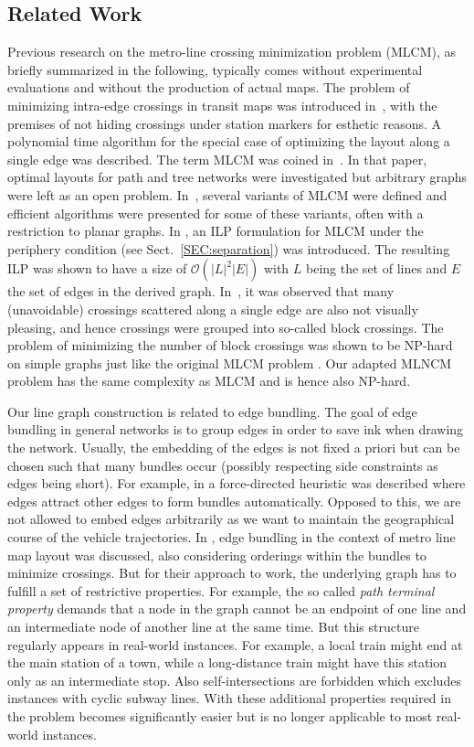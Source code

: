 \documentclass[sigconf]{acmart}
\begin{document}
%
\subsection{Related Work}\label{SEC:related}
%

Previous research on the metro-line crossing minimization problem (MLCM), as briefly summarized in the following, typically comes without experimental evaluations and without the production of actual maps.
The problem of minimizing intra-edge crossings in transit maps was introduced in~\cite{ben06},
with the premises of not hiding crossings under station markers for esthetic reasons.
A polynomial time algorithm for the special case of optimizing the layout along a single edge was described.
The term MLCM was coined in~\cite{bek07}.
In that paper, optimal layouts for path and tree networks were investigated but arbitrary graphs were left as an open problem.
In~\cite{arg08, arg10, nol09}, several variants of MLCM were defined and efficient algorithms were presented for some of these variants, often with a restriction to planar graphs.
In \cite{asq08}, an ILP formulation for MLCM under the periphery condition (see Sect.~\ref{SEC:separation}) was introduced.
The resulting ILP was shown to have a size of $\mathcal{O}(|L|^2|E|)$ with $L$ being the set of lines and $E$ the set of edges in the derived graph.
In~\cite{fin13b}, it was observed that many (unavoidable) crossings scattered along a single edge are also not visually pleasing,
and hence crossings were grouped into so-called block crossings.
The problem of minimizing the number of block crossings was shown to be NP-hard on simple graphs just like the original MLCM problem \cite{fin13a}.
Our adapted MLNCM problem has the same complexity as MLCM and is hence also NP-hard.

Our line graph construction is related to edge bundling. The goal of edge bundling in general networks is to group edges in order to save ink when drawing the network. Usually, the embedding of the edges is not fixed a priori but can be chosen such that many bundles occur (possibly respecting side constraints as edges being short). For example, in \cite{hol09} a force-directed heuristic was described where edges attract other edges to form bundles automatically. Opposed to this, we are not allowed to embed edges arbitrarily as we want to maintain the geographical course of the vehicle trajectories. In \cite{pup11}, edge bundling in the context of metro line map layout was discussed, also considering orderings within the bundles to minimize crossings. But for their approach to work, the underlying graph has to fulfill a set of restrictive properties. For example, the so called \emph{path terminal property} demands that a node in the graph cannot be an endpoint of one line and an intermediate node of another line at the same time. But this structure regularly appears in real-world instances. For example, a local train might end at the main station of a town, while a long-distance train might have this station only as an intermediate stop. Also self-intersections are forbidden which excludes instances with cyclic subway lines. With these additional properties required in \cite{pup11} the problem becomes significantly easier but is no longer applicable to most real-world instances.
\end{document}
